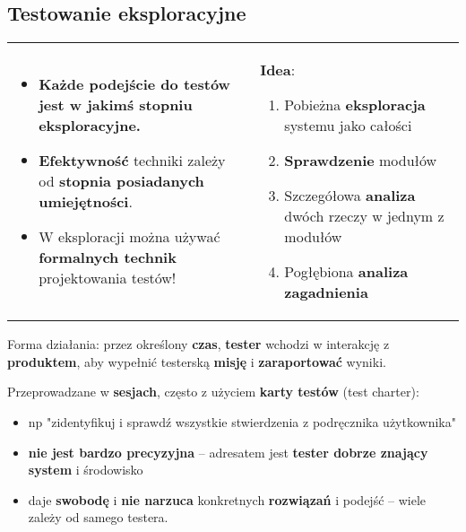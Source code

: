 \documentclass[../main.tex]{subfiles}
\begin{document}
    \subsection{Testowanie eksploracyjne}

    \begin{table}[H]
        \begin{center}
            \begin{tabular}{p{8cm} p{8cm}}
                \begin{itemize}
                    \item \textbf{Każde podejście do testów jest w jakimś stopniu eksploracyjne.}

                    \item \textbf{Efektywność} techniki zależy od \textbf{stopnia posiadanych umiejętności}.

                    \item W eksploracji można używać \textbf{formalnych technik} projektowania testów!
                \end{itemize}
                &
                \textbf{Idea}:
                \begin{enumerate}
                    \item Pobieżna \textbf{eksploracja} systemu jako całości
                    \item \textbf{Sprawdzenie} modułów
                    \item Szczegółowa \textbf{analiza} dwóch rzeczy w jednym z modułów
                    \item Pogłębiona \textbf{analiza zagadnienia}
                \end{enumerate}
            \end{tabular}
        \end{center}
    \end{table}

    Forma działania: przez określony \textbf{czas}, \textbf{tester} wchodzi w interakcję z \textbf{produktem},
    aby wypełnić testerską \textbf{misję} i \textbf{zaraportować} wyniki.

    Przeprowadzane w \textbf{sesjach}, często z użyciem \textbf{karty testów} (test charter):
    \begin{itemize}
        \item np "zidentyfikuj i sprawdź
        wszystkie stwierdzenia z podręcznika użytkownika"
        \item \textbf{nie jest bardzo precyzyjna} – adresatem jest \textbf{tester dobrze znający system} i środowisko
        \item daje \textbf{swobodę} i \textbf{nie narzuca} konkretnych \textbf{rozwiązań} i podejść – wiele zależy od samego testera.
    \end{itemize}
\end{document}

